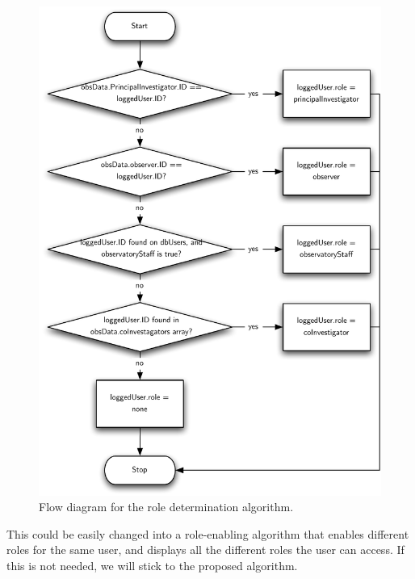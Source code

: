 		\begin{figure}[tbp]
		\begin{center}
		\includegraphics[width=\columnwidth]
			{fig/Policy-RoleDeterminationAlgorithm.pdf}
		\end{center}
		\caption[Role determination algorithm]
			{Flow diagram for the role determination algorithm.}
		\label{figPolicyRoles}
		\end{figure}
			
		This could be easily changed into a role-enabling algorithm
		that enables different roles for the same user, and
		displays all the different roles the user can access. If
		this is not needed, we will stick to the proposed
		algorithm.
		
